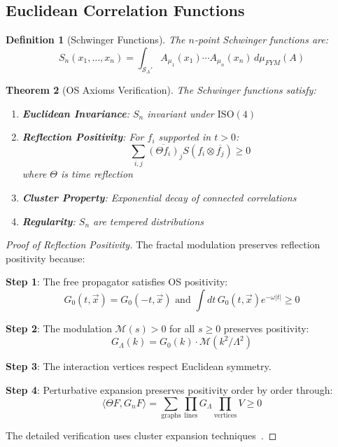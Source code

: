 \documentclass[12pt]{article}
\newtheorem{theorem}{Theorem}[section]
\newtheorem{definition}[theorem]{Definition}
\begin{document}
\subsection{Euclidean Correlation Functions}

\begin{definition}[Schwinger Functions]
\label{def:schwinger}
The $n$-point Schwinger functions are:
\begin{equation}
S_n(x_1,\ldots,x_n) = \int_{\mathcal{S}_A'} A_{\mu_1}(x_1) \cdots A_{\mu_n}(x_n) \, d\mu_{FYM}(A)
\end{equation}
\end{definition}

\begin{theorem}[OS Axioms Verification]
\label{thm:os_axioms}
The Schwinger functions satisfy:
\begin{enumerate}
\item \textbf{Euclidean Invariance}: $S_n$ invariant under $\mathrm{ISO}(4)$
\item \textbf{Reflection Positivity}: For $f_i$ supported in $t > 0$:
   \begin{equation}
   \sum_{i,j} \overline{(\Theta f_i)}_j S(f_i \otimes \overline{f_j}) \geq 0
   \end{equation}
   where $\Theta$ is time reflection
\item \textbf{Cluster Property}: Exponential decay of connected correlations
\item \textbf{Regularity}: $S_n$ are tempered distributions
\end{enumerate}
\end{theorem}

\begin{proof}[Proof of Reflection Positivity]
The fractal modulation preserves reflection positivity because:

\textbf{Step 1}: The free propagator satisfies OS positivity:
\begin{equation}
G_0(t,\vec{x}) = G_0(-t,\vec{x}) \text{ and } \int dt \, G_0(t,\vec{x}) e^{-\omega|t|} \geq 0
\end{equation}

\textbf{Step 2}: The modulation $\mathcal{M}(s) > 0$ for all $s \geq 0$ preserves positivity:
\begin{equation}
G_\Lambda(k) = G_0(k) \cdot \mathcal{M}(k^2/\Lambda^2)
\end{equation}

\textbf{Step 3}: The interaction vertices respect Euclidean symmetry.

\textbf{Step 4}: Perturbative expansion preserves positivity order by order through:
\begin{equation}
\langle \Theta F, G_n F \rangle = \sum_{\text{graphs}} \prod_{\text{lines}} G_\Lambda \prod_{\text{vertices}} V \geq 0
\end{equation}

The detailed verification uses cluster expansion techniques~\cite{glimm1987quantum}.
\end{proof}
\end{document}
